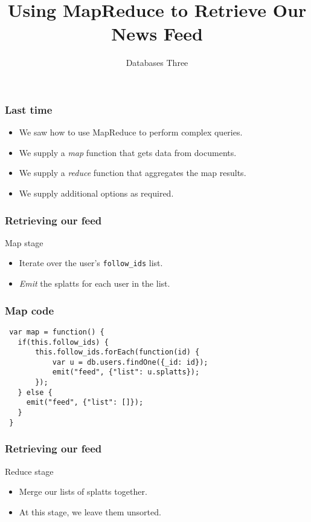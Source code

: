 \documentclass[10pt]{beamer}
\title{Using MapReduce to Retrieve Our News Feed}
\author[IN705]{Databases Three}
\institute[Otago Polytechnic]{
  Otago Polytechnic \\
  Dunedin, New Zealand \\
}
\date{}
\begin{document}
\begin{frame}[plain]
  \titlepage
\end{frame}



\begin{frame}
  \frametitle{Last time}

 \begin{itemize}
  \item We saw how to use MapReduce to perform complex queries.
  \item We supply a \emph{map} function that gets data from documents.
  \item We supply a \emph{reduce} function that aggregates the map results.
  \item We supply additional options as required.
 \end{itemize}

\end{frame}


\begin{frame}
  \frametitle{Retrieving our feed}

 Map stage
 \begin{itemize}
	 \item Iterate over the user's \texttt{follow\_ids} list.
         \item \emph{Emit} the splatts for each user in the list.
 \end{itemize}

\end{frame}


\begin{frame}[fragile]
  \frametitle{Map code}

 \begin{verbatim}
 var map = function() {
   if(this.follow_ids) {
       this.follow_ids.forEach(function(id) {
           var u = db.users.findOne({_id: id});
           emit("feed", {"list": u.splatts});
       });
   } else {
     emit("feed", {"list": []});
   }
 }
 \end{verbatim}

\end{frame}


\begin{frame}
  \frametitle{Retrieving our feed}
 Reduce stage
 \begin{itemize}
  \item Merge our lists of splatts together.
  \item At this stage, we leave them unsorted.
 \end{itemize}

\end{frame}
\end{document}
